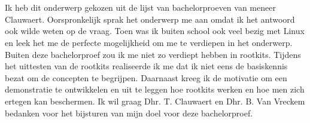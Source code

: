 
\chapter*{}%
\label{ch:voorwoord}


Ik heb dit onderwerp gekozen uit de lijst van bachelorproeven van meneer Clauwaert. Oorspronkelijk sprak het onderwerp me aan omdat ik het antwoord ook wilde weten op de vraag. Toen was ik buiten school ook veel bezig met Linux en leek het me de perfecte mogelijkheid om me te verdiepen in het onderwerp. Buiten deze bachelorproef zou ik me niet zo verdiept hebben in rootkits. Tijdens het uittesten van de rootkits realiseerde ik me dat ik niet eens de basiskennis bezat om de concepten te begrijpen. Daarnaast kreeg ik de motivatie om een demonstratie te ontwikkelen en uit te leggen hoe rootkits werken en hoe men zich ertegen kan beschermen. Ik wil graag Dhr. T. Clauwaert en Dhr. B. Van Vreckem bedanken voor het bijsturen van mijn doel voor deze bachelorproef. 